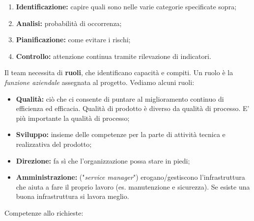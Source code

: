 \begin{enumerate}

	\item \textbf{Identificazione:} capire quali sono nelle varie categorie specificate sopra;
	
	\item \textbf{Analisi:} probabilità di occorrenza;
	
	\item \textbf{Pianificazione:} come evitare i rischi;
	
	\item \textbf{Controllo:} attenzione continua tramite rilevazione di indicatori.

\end{enumerate}

Il team necessita di \textbf{ruoli}, che identificano capacità e compiti. Un ruolo è la \textit{funzione aziendale} assegnata al progetto. Vediamo alcuni ruoli:

\begin{itemize}

	\item \textbf{Qualità:} ciò che ci consente di puntare al miglioramento continuo di efficienza ed efficacia. Qualità di prodotto è diverso da qualità di processo. E' più importante la qualità di processo;
	
	\item \textbf{Sviluppo:} insieme delle competenze per la parte di attività tecnica e realizzativa del prodotto;
	
	\item \textbf{Direzione:} fa sì che l'organizzazione possa stare in piedi;
	
	\item \textbf{Amministrazione:} ("\textit{service manager}") erogano/gestiscono l'infrastruttura che aiuta a fare il proprio lavoro (es. manutenzione e sicurezza). Se esiste una buona infrastruttura si lavora meglio.

\end{itemize}

Competenze allo richieste:

